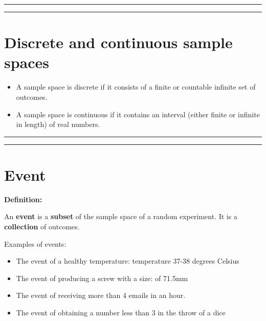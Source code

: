 \documentclass[
]{book}
\providecommand{\tightlist}{%
  \setlength{\itemsep}{0pt}\setlength{\parskip}{0pt}}
\begin{document}
\begin{center}\rule{0.5\linewidth}{0.5pt}\end{center}

\begin{center}\rule{0.5\linewidth}{0.5pt}\end{center}

\hypertarget{discrete-and-continuous-sample-spaces}{%
\section{Discrete and continuous sample spaces}\label{discrete-and-continuous-sample-spaces}}

\begin{itemize}
\item
  A sample space is discrete if it consists of a finite or countable infinite set of outcomes.
\item
  A sample space is continuous if it contains an interval (either finite or infinite in length) of
  real numbers.
\end{itemize}

\begin{center}\rule{0.5\linewidth}{0.5pt}\end{center}

\begin{center}\rule{0.5\linewidth}{0.5pt}\end{center}

\hypertarget{event}{%
\section{Event}\label{event}}

\textbf{Definition:}

An \textbf{event} is a \textbf{subset} of the sample space of a random experiment. It is a \textbf{collection} of outcomes.

Examples of events:

\begin{itemize}
\tightlist
\item
  The event of a healthy temperature: temperature 37-38 degrees Celsius
\item
  The event of producing a screw with a size: of 71.5mm
\item
  The event of receiving more than 4 emails in an hour.
\item
  The event of obtaining a number less than 3 in the throw of a dice
\end{itemize}
\end{document}
